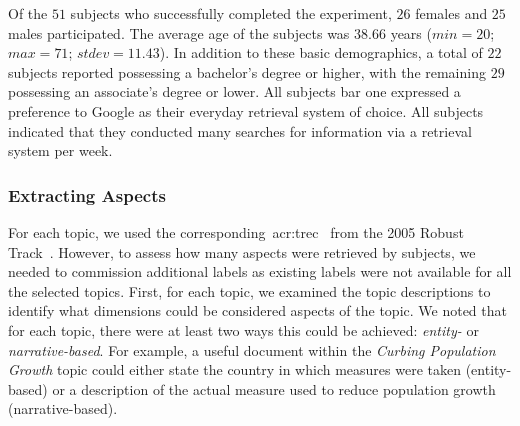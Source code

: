 Of the $51$ subjects who successfully completed the experiment, $26$ females and $25$ males participated. The average age of the subjects was $38.66$ years ($min=20$; $max=71$; $stdev=11.43$). In addition to these basic demographics, a total of $22$ subjects reported possessing a bachelor's degree or higher, with the remaining $29$ possessing an associate's degree or lower. All subjects bar one expressed a preference to Google as their everyday retrieval system of choice. All subjects indicated that they conducted many searches for information via a retrieval system per week.


\subsubsection{Extracting Aspects}\label{sec:diversity:users:method:aspects}
For each topic, we used the corresponding~\gls{acr:trec}~ from the 2005 Robust Track~\citep{voorhees2006trec_robust}. However, to assess how many aspects were retrieved by subjects, we needed to commission additional labels as existing labels were not available for all the selected topics. First, for each topic, we examined the topic descriptions to identify what dimensions could be considered aspects of the topic. We noted that for each topic, there were at least two ways this could be achieved: \emph{entity-} or \emph{narrative-based}. For example, a useful document within the \emph{Curbing Population Growth} topic could either state the country in which measures were taken (entity-based) or a description of the actual measure used to reduce population growth (narrative-based).

